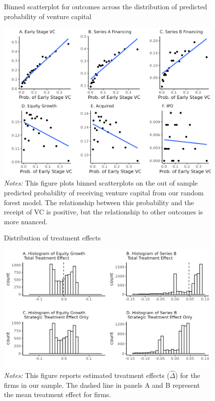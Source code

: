 \documentclass[11pt]{article}
\begin{document}
\begin{center}
\begin{figure}
  \caption{Binned scatterplot for outcomes across the distribution of predicted probability of venture capital}
  \includegraphics[width=.85\textwidth]{binscatters_p_vc_by_outcome.png}
      \caption*{\footnotesize \emph{Notes:} This figure plots binned scatterplots on the out of sample predicted probability of receiving venture capital from our random forest model. The relationship between this probability and the receipt of VC is positive, but the relationship to other outcomes is more nuanced. }

\end{figure}

\begin{figure}
 \caption{Distribution of treatment effects}
  \includegraphics[width=.85\textwidth]{dist_treatment_effect.png}
      \caption*{\footnotesize \emph{Notes:} This figure reports estimated treatment effects ($\hat{\Delta}$) for the firms in our sample. The dashed line in panels A and B represent the mean treatment effect for firms. }

\end{figure}


\end{center}
\end{document}
